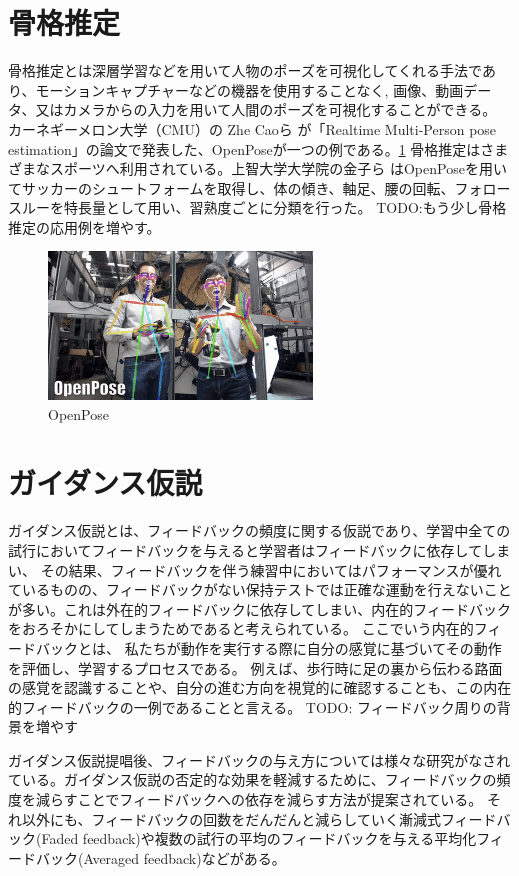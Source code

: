 \section{骨格推定}
骨格推定とは深層学習などを用いて人物のポーズを可視化してくれる手法であり、モーションキャプチャーなどの機器を使用することなく,
画像、動画データ、又はカメラからの入力を用いて人間のポーズを可視化することができる。
カーネギーメロン大学（CMU）の Zhe Caoら が「Realtime Multi-Person pose estimation」\cite{openpose}の論文で発表した、OpenPoseが一つの例である。\ref{fig:openpose}
骨格推定はさまざまなスポーツへ利用されている。上智大学大学院の金子ら \cite{soccer_openpose}はOpenPoseを用いてサッカーのシュートフォームを取得し、体の傾き、軸足、腰の回転、フォロースルーを特長量として用い、習熟度ごとに分類を行った。
TODO:もう少し骨格推定の応用例を増やす。
\begin{figure}[htbp]
    \begin{center}
        \includegraphics[width=7cm]{figures/openpose.png}
        \caption{OpenPose}
        \label{fig:openpose}
    \end{center}
  \end{figure}
\section{ガイダンス仮説}
ガイダンス仮説\cite{guidance_hypothesis}とは、フィードバックの頻度に関する仮説であり、学習中全ての試行においてフィードバックを与えると学習者はフィードバックに依存してしまい、
その結果、フィードバックを伴う練習中においてはパフォーマンスが優れているものの、フィードバックがない保持テストでは正確な運動を行えないことが多い。これは外在的フィードバックに依存してしまい、内在的フィードバックをおろそかにしてしまうためであると考えられている。
ここでいう内在的フィードバックとは、
私たちが動作を実行する際に自分の感覚に基づいてその動作を評価し、学習するプロセスである。
例えば、歩行時に足の裏から伝わる路面の感覚を認識することや、自分の進む方向を視覚的に確認することも、この内在的フィードバックの一例であることと言える。\cite{nagoyahml_feedback}
TODO: フィードバック周りの背景を増やす

ガイダンス仮説提唱後、フィードバックの与え方については様々な研究がなされている。ガイダンス仮説の否定的な効果を軽減するために、フィードバックの頻度を減らすことでフィードバックへの依存を減らす方法が提案されている。
それ以外にも、フィードバックの回数をだんだんと減らしていく漸減式フィードバック(Faded feedback)\cite{Aoyagi2019}や複数の試行の平均のフィードバックを与える平均化フィードバック(Averaged feedback)\cite{Aoyagi2019}などがある。
